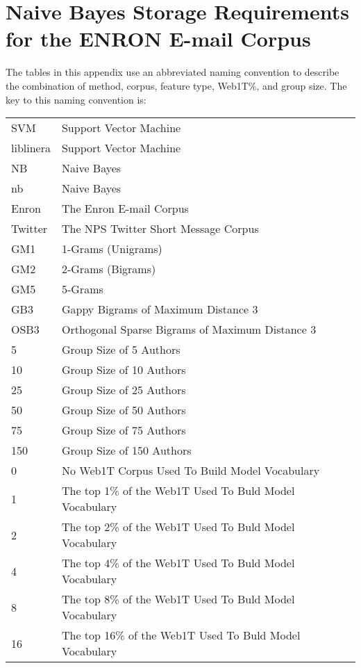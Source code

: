 \chapter{Naive Bayes Storage Requirements for the ENRON E-mail Corpus}

The tables in this appendix use an abbreviated naming convention to describe the combination of method, corpus, feature type, Web1T\%, and group size.  The key to this naming convention is:

\begin{center}
\begin{table}[htbp!]
	\begin{center}
	\begin{tabular}{ll}
	SVM & Support Vector Machine\\
	liblinera & Support Vector Machine\\
	NB & Naive Bayes\\
	nb & Naive Bayes\\
	
	Enron & The Enron E-mail Corpus\\
	Twitter & The NPS Twitter Short Message Corpus\\
	
	GM1 & 1-Grams (Unigrams)\\
	GM2 & 2-Grams (Bigrams)\\
	GM5 & 5-Grams\\
	GB3 & Gappy Bigrams of Maximum Distance 3\\
	OSB3 & Orthogonal Sparse Bigrams of Maximum Distance 3\\
		
	5 & Group Size of 5 Authors\\
	10 & Group Size of 10 Authors\\
	25 & Group Size of 25 Authors\\
	50 & Group Size of 50 Authors\\
	75 & Group Size of 75 Authors\\
	150 & Group Size of 150 Authors\\
	
	0 & No Web1T Corpus Used To Build Model Vocabulary\\
	1 & The top 1\% of the Web1T Used To Buld Model Vocabulary\\
	2 & The top 2\% of the Web1T Used To Buld Model Vocabulary\\
	4 & The top 4\% of the Web1T Used To Buld Model Vocabulary\\
	8 & The top 8\% of the Web1T Used To Buld Model Vocabulary\\
	16 & The top 16\% of the Web1T Used To Buld Model Vocabulary\\
	\end{tabular}
	\end{center}
\end{table}
\end{center}



